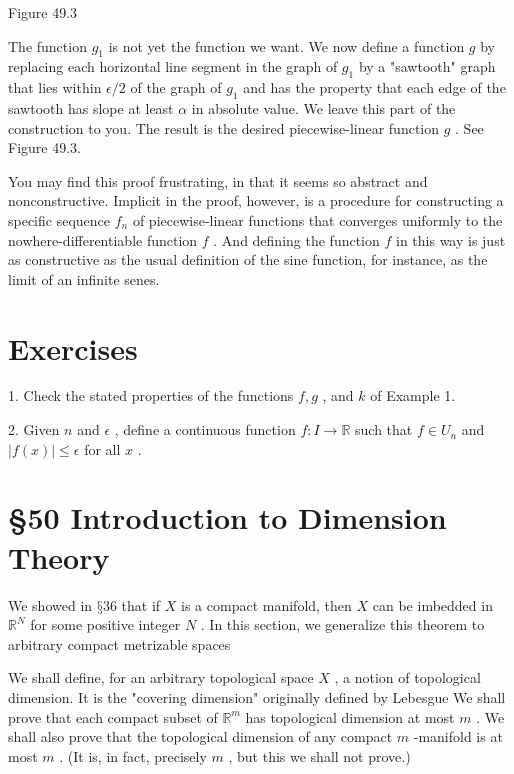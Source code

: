 Figure 49.3

The function \({g}_{1}\) is not yet the function we want. We now define a function \(g\) by replacing each horizontal line segment in the graph of \({g}_{1}\) by a "sawtooth" graph that lies within \(\epsilon /2\) of the graph of \({g}_{1}\) and has the property that each edge of the sawtooth has slope at least \(\alpha\) in absolute value. We leave this part of the construction to you. The result is the desired piecewise-linear function \(g\) . See Figure 49.3.

You may find this proof frustrating, in that it seems so abstract and nonconstructive. Implicit in the proof, however, is a procedure for constructing a specific sequence \({f}_{n}\) of piecewise-linear functions that converges uniformly to the nowhere-differentiable function \(f\) . And defining the function \(f\) in this way is just as constructive as the usual definition of the sine function, for instance, as the limit of an infinite senes.

\section*{Exercises}

1. Check the stated properties of the functions \(f,g\) , and \(k\) of Example 1.

2. Given \(n\) and \(\epsilon\) , define a continuous function \(f : I \rightarrow  \mathbb{R}\) such that \(f \in  {U}_{n}\) and \(\left| {f\left( x\right) }\right|  \leq  \epsilon\) for all \(x\) .

\section*{§50 Introduction to Dimension Theory}

We showed in \(§{36}\) that if \(X\) is a compact manifold, then \(X\) can be imbedded in \({\mathbb{R}}^{N}\) for some positive integer \(N\) . In this section, we generalize this theorem to arbitrary compact metrizable spaces

We shall define, for an arbitrary topological space \(X\) , a notion of topological dimension. It is the "covering dimension" originally defined by Lebesgue We shall prove that each compact subset of \({\mathbb{R}}^{m}\) has topological dimension at most \(m\) . We shall also prove that the topological dimension of any compact \(m\) -manifold is at most \(m\) . (It is, in fact, precisely \(m\) , but this we shall not prove.)

